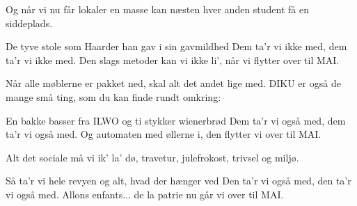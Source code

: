 \documentclass[a4paper,11pt]{article}
\begin{document}
\begin{song}
     Og når vi nu får lokaler en masse
              kan næsten hver anden student få en siddeplads.

     De tyve stole som Haarder han gav i sin gavmildhed
              Dem ta'r vi ikke med, dem ta'r vi ikke med.
              Den slags metoder kan vi ikke li',
              når vi flytter over til MAI.

     Når alle møblerne er pakket ned,
              skal alt det andet lige med.
              DIKU er også de mange små ting,
              som du kan finde rundt omkring:

     En bakke basser fra ILWO og ti stykker wienerbrød
              Dem ta'r vi også med, dem ta'r vi også med.
              Og automaten med øllerne i,
              den flytter vi over til MAI.

     Alt det sociale må vi ik' la' dø,
              travetur, julefrokost, trivsel og miljø.

     Så ta'r vi hele revyen og alt, hvad der hænger ved
              Den ta'r vi også med, den ta'r vi også med.
              Allons enfants... de la patrie
              nu går vi over til MAI.
\end{song}
\end{document}
